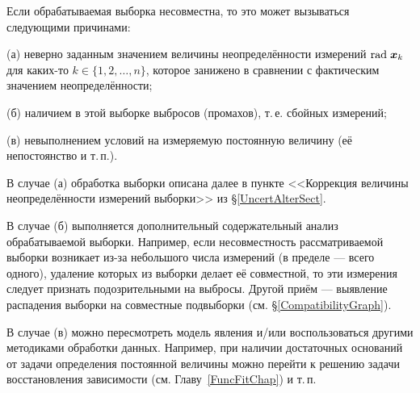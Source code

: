 \documentclass[a5paper,openany]{book}
\newcommand{\mbf}[1]{\protect\text{\boldmath$#1$}}
\renewcommand{\r}{\mathrm{rad}\;}
\begin{document}
Если обрабатываемая выборка несовместна, то это может вызываться следующими причинами: 
\begin{list}{}{\leftmargin=14mm\itemsep=5pt\topsep=4pt\parsep=2pt} 
\item[(а)] 
неверно заданным значением величины неопределённости измерений $\r\mbf{x}_k$ для каких-то 
$k\in\{ 1,2,\ldots,n \}$, которое занижено в сравнении с фактическим значением 
неопределённости; 
\item[(б)] 
наличием в этой выборке выбросов (промахов), т.\,е. сбойных измерений; 
\item[(в)] 
невыполнением условий на измеряемую постоянную величину (её непостоянство и т.\,п.). 
\end{list} 
  
В случае (а) обработка выборки описана далее в пункте <<Коррекция величины 
неопределённости измерений выборки>> из \S\ref{UncertAlterSect}. 
  
В случае (б) выполняется дополнительный содержательный анализ обрабатываемой выборки. 
Например, если несовместность рассматриваемой выборки возникает из-за небольшого числа 
измерений (в пределе --- всего одного), удаление которых из выборки делает её совместной, 
то эти измерения следует признать подозрительными на выбросы. Другой приём --- выявление 
распадения выборки на совместные подвыборки (см. \S\ref{CompatibilityGraph}). 
  
В случае (в) можно пересмотреть модель явления и/или воспользоваться другими методиками 
обработки данных. Например, при наличии достаточных оснований от задачи определения 
постоянной величины можно перейти к решению задачи восстановления зависимости 
(см. Главу~\ref{FuncFitChap}) и т.\,п. 
     
   
   
\end{document}
